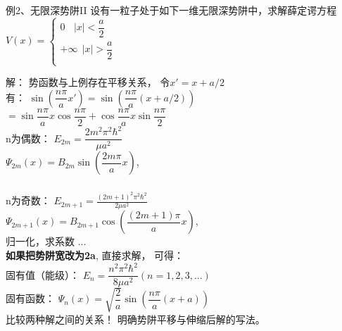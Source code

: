 \begin{frame}
	\frametitle{}
	\begin{exampleblock} {例2、无限深势阱II}
		设有一粒子处于如下一维无限深势阱中，求解薛定谔方程\\
		{ $ \displaystyle 
			V(x)=\left \{ 
			\begin{array}{cccc}
				0	~~ ~~ |x|<\dfrac{a}{2} \\  
				+\infty ~~|x|>\dfrac{a}{2}\\
			\end{array}
			\right.
		$} \\
	\end{exampleblock}
	\alert{解：} 	势函数与上例存在平移关系， 令$x' =x+a/2$\\
	有：  $  \sin(\dfrac{n\pi}{a}x') =\sin(\dfrac{n\pi}{a} (x+a/2)) $ \\
	\hspace{2cm}$=\sin \dfrac{n\pi}{a} x \cos \dfrac{n\pi}{2} + \cos \dfrac{n\pi}{a} x \sin \dfrac{n\pi}{2}  $ \\ 
	n为偶数： $E_{2m} = \dfrac{2m^2\pi^2\hbar^2}{\mu a^2} $\\
	\hspace{2cm}$ \Psi_{2m}(x)= B_{2m} \sin(\dfrac{2m\pi}{a}x) $,   \\
\end{frame}

\begin{frame}
	\frametitle{}
	n为奇数：  $E_{2m+1} = \frac{(2m+1)^2\pi^2\hbar^2}{2\mu a^2} $ \\
	\hspace{2cm}$ \Psi_{2m+1}(x)= B_{2m+1} \cos(\dfrac{(2m+1)\pi}{a}x) $,  \\
	归一化，求系数 ... \\	 \vspace{0.6cm}	
	\textbf{如果把势阱宽改为2a}, 直接求解， 可得： \\
	固有值（能级）：{ $E_n = \dfrac{n^2\pi^2\hbar^2}{8\mu a^2} (n=1,2,3,...)$} \\
	固有函数： $ \Psi_n(x)= \sqrt{\dfrac{2}{a}} \sin(\dfrac{n\pi}{a}(x+a)) $ \\  \vspace{0.6cm}	
	比较两种解之间的关系！	明确势阱平移与伸缩后解的写法。
\end{frame}

